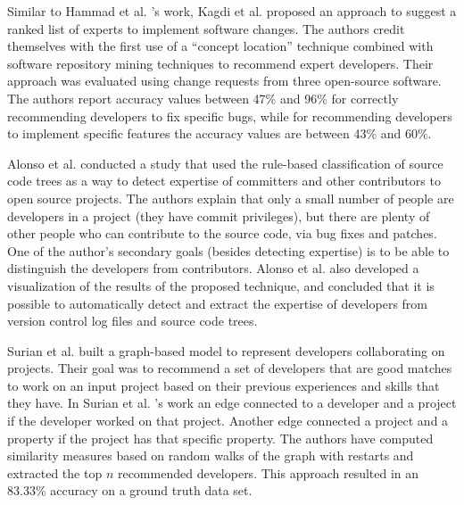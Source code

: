         Similar to Hammad et al. \cite{hammad2013identifying}'s work, Kagdi et al. \cite{kagdi2012assigning} proposed an approach to suggest a ranked list of experts to implement software changes. The authors credit themselves with the first use of a ``concept location'' technique combined with software repository mining techniques to recommend expert developers. Their approach was evaluated using change requests from three open-source software. The authors report accuracy values between 47\% and 96\% for correctly recommending developers to fix specific bugs, while for recommending developers to implement specific features the accuracy values are between 43\% and 60\%.
        
        Alonso et al. \cite{alonso2008expertise} conducted a study that used the rule-based classification of source code trees as a way to detect expertise of committers and other contributors to open source projects. The authors explain that only a small number of people are developers in a project (they have commit privileges), but there are plenty of other people who can contribute to the source code, via bug fixes and patches. One of the author's secondary goals (besides detecting expertise) is to be able to distinguish the developers from contributors. Alonso et al. also developed a visualization of the results of the proposed technique, and concluded that it is possible to automatically detect and extract the expertise of developers from version control log files and source code trees.
        
        Surian et al. \cite{surian2011recommending} built a graph-based model to represent developers collaborating on projects. Their goal was to recommend a set of developers that are good matches to work on an input project based on their previous experiences and skills that they have. In Surian et al. \cite{surian2011recommending}'s work an edge connected to a developer and a project if the developer worked on that project. Another edge connected a project and a property if the project has that specific property. The authors have computed similarity measures based on random walks of the graph with restarts and extracted the top $n$ recommended developers. This approach resulted in an 83.33\% accuracy on a ground truth data set.
        
